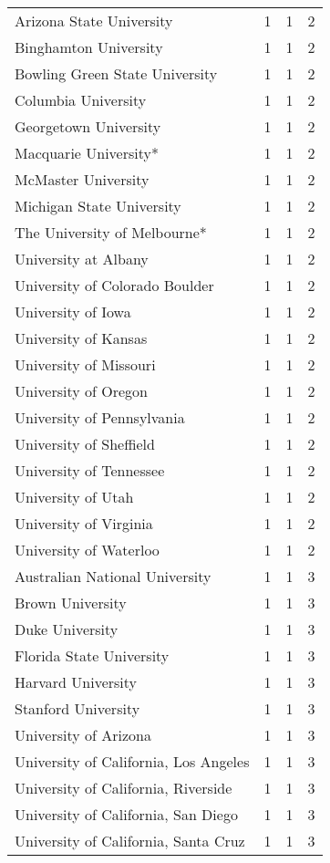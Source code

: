 \begin{longtable}[t]{llll}
Arizona State University & 1 & 1 & 2\\
Binghamton University & 1 & 1 & 2\\
Bowling Green State University & 1 & 1 & 2\\
\addlinespace
Columbia University & 1 & 1 & 2\\
Georgetown University & 1 & 1 & 2\\
Macquarie University* & 1 & 1 & 2\\
McMaster University & 1 & 1 & 2\\
Michigan State University & 1 & 1 & 2\\
\addlinespace
The University of Melbourne* & 1 & 1 & 2\\
University at Albany & 1 & 1 & 2\\
University of Colorado Boulder & 1 & 1 & 2\\
University of Iowa & 1 & 1 & 2\\
University of Kansas & 1 & 1 & 2\\
\addlinespace
University of Missouri & 1 & 1 & 2\\
University of Oregon & 1 & 1 & 2\\
University of Pennsylvania & 1 & 1 & 2\\
University of Sheffield & 1 & 1 & 2\\
University of Tennessee & 1 & 1 & 2\\
\addlinespace
University of Utah & 1 & 1 & 2\\
University of Virginia & 1 & 1 & 2\\
University of Waterloo & 1 & 1 & 2\\
Australian National University & 1 & 1 & 3\\
Brown University & 1 & 1 & 3\\
\addlinespace
Duke University & 1 & 1 & 3\\
Florida State University & 1 & 1 & 3\\
Harvard University & 1 & 1 & 3\\
Stanford University & 1 & 1 & 3\\
University of Arizona & 1 & 1 & 3\\
\addlinespace
University of California, Los Angeles & 1 & 1 & 3\\
University of California, Riverside & 1 & 1 & 3\\
University of California, San Diego & 1 & 1 & 3\\
University of California, Santa Cruz & 1 & 1 & 3\\

\end{longtable}
